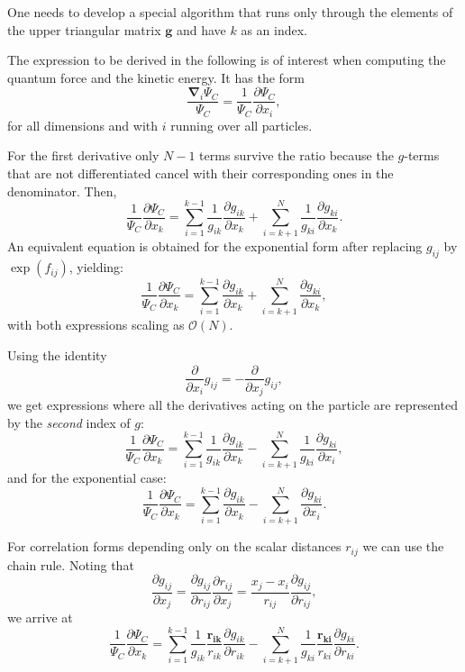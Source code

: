 \documentclass[graybox,sectrefs,envcountresetchap,open=right]{svmonodo}
\begin{document}
One needs to develop a special algorithm 
that runs only through the elements of the upper triangular
matrix $\mathbf{g}$ and have $k$ as an index. 

The expression to be derived in the following is of interest when computing the quantum force and the kinetic energy. It has the form
\[
\frac{\mathbf{\nabla}_i\Psi_C}{\Psi_C} = \frac{1}{\Psi_C}\frac{\partial \Psi_C}{\partial x_i},
\]
for all dimensions and with $i$ running over all particles.




For the first derivative only $N-1$ terms survive the ratio because the $g$-terms that are not differentiated cancel with their corresponding ones in the denominator. Then,
\[
\frac{1}{\Psi_C}\frac{\partial \Psi_C}{\partial x_k} =
\sum_{i=1}^{k-1}\frac{1}{g_{ik}}\frac{\partial g_{ik}}{\partial x_k}
+
\sum_{i=k+1}^{N}\frac{1}{g_{ki}}\frac{\partial g_{ki}}{\partial x_k}.
\]
An equivalent equation is obtained for the exponential form after replacing $g_{ij}$ by $\exp(f_{ij})$, yielding:
\[
\frac{1}{\Psi_C}\frac{\partial \Psi_C}{\partial x_k} =
\sum_{i=1}^{k-1}\frac{\partial g_{ik}}{\partial x_k}
+
\sum_{i=k+1}^{N}\frac{\partial g_{ki}}{\partial x_k},
\]
with both expressions scaling as $\mathcal{O}(N)$.







Using the identity 
\[
\frac{\partial}{\partial x_i}g_{ij} = -\frac{\partial}{\partial x_j}g_{ij},
\]
we get expressions where all the derivatives acting on the particle  are represented by the \emph{second} index of $g$:
\[
\frac{1}{\Psi_C}\frac{\partial \Psi_C}{\partial x_k} =
\sum_{i=1}^{k-1}\frac{1}{g_{ik}}\frac{\partial g_{ik}}{\partial x_k}
-\sum_{i=k+1}^{N}\frac{1}{g_{ki}}\frac{\partial g_{ki}}{\partial x_i},
\]
and for the exponential case:
\[
\frac{1}{\Psi_C}\frac{\partial \Psi_C}{\partial x_k} =
\sum_{i=1}^{k-1}\frac{\partial g_{ik}}{\partial x_k}
-\sum_{i=k+1}^{N}\frac{\partial g_{ki}}{\partial x_i}.
\]





For correlation forms depending only on the scalar distances $r_{ij}$ we can use the chain rule. Noting that 
\[
\frac{\partial g_{ij}}{\partial x_j} = \frac{\partial g_{ij}}{\partial r_{ij}} \frac{\partial r_{ij}}{\partial x_j} = \frac{x_j - x_i}{r_{ij}} \frac{\partial g_{ij}}{\partial r_{ij}},
\]
we arrive at
\[
\frac{1}{\Psi_C}\frac{\partial \Psi_C}{\partial x_k} = 
\sum_{i=1}^{k-1}\frac{1}{g_{ik}} \frac{\mathbf{r_{ik}}}{r_{ik}} \frac{\partial g_{ik}}{\partial r_{ik}}
-\sum_{i=k+1}^{N}\frac{1}{g_{ki}}\frac{\mathbf{r_{ki}}}{r_{ki}}\frac{\partial g_{ki}}{\partial r_{ki}}.
\]
\end{document}
